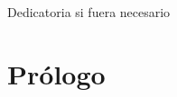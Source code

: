 \documentclass[twoside, 12pt]{book}
\begin{document}
\hfill
\begin{minipage}{0.66\textwidth}
{\fontsize{12}{14}
Dedicatoria si fuera necesario
\selectfont
}

\end{minipage}
\clearemptydoublepage

\restoregeometry %

\pagestyle{plain}

\dominitoc

\tableofcontents
\clearemptydoublepage



\mainmatter

\chapter*{Prólogo}
\lipsum[1-2]
\clearemptydoublepage

\pagestyle{fancy}


\clearemptydoublepage


\clearemptydoublepage

% 

\backmatter

\nocite{*} %
\printglossaries
\end{document}
